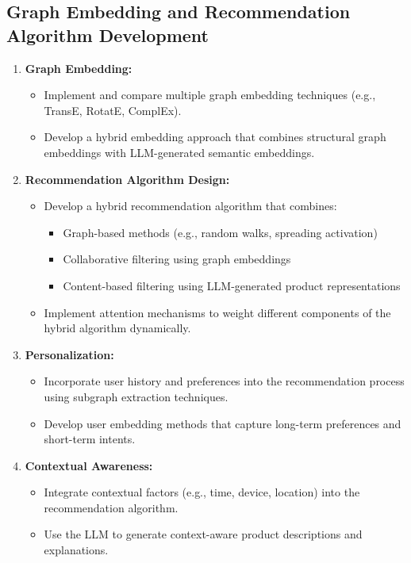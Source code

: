 \documentclass{article}
\begin{document}
\subsection{Graph Embedding and Recommendation Algorithm Development}
\begin{enumerate}
    \item \textbf{Graph Embedding:}
    \begin{itemize}
        \item Implement and compare multiple graph embedding techniques (e.g., TransE, RotatE, ComplEx).
        \item Develop a hybrid embedding approach that combines structural graph embeddings with LLM-generated semantic embeddings.
    \end{itemize}
    
    \item \textbf{Recommendation Algorithm Design:}
    \begin{itemize}
        \item Develop a hybrid recommendation algorithm that combines:
        \begin{itemize}
            \item Graph-based methods (e.g., random walks, spreading activation)
            \item Collaborative filtering using graph embeddings
            \item Content-based filtering using LLM-generated product representations
        \end{itemize}
        \item Implement attention mechanisms to weight different components of the hybrid algorithm dynamically.
    \end{itemize}
    
    \item \textbf{Personalization:}
    \begin{itemize}
        \item Incorporate user history and preferences into the recommendation process using subgraph extraction techniques.
        \item Develop user embedding methods that capture long-term preferences and short-term intents.
    \end{itemize}
    
    \item \textbf{Contextual Awareness:}
    \begin{itemize}
        \item Integrate contextual factors (e.g., time, device, location) into the recommendation algorithm.
        \item Use the LLM to generate context-aware product descriptions and explanations.
    \end{itemize}
    

\end{enumerate}
\end{document}
